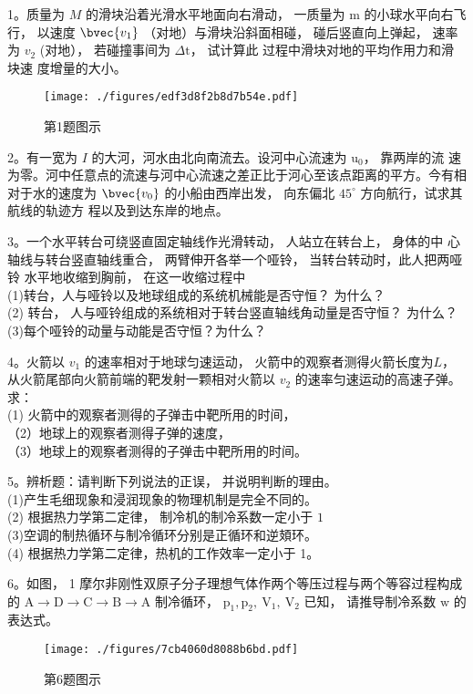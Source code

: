 
1。质量为 $M$ 的滑块沿着光滑水平地面向右滑动， 一质量为 $\mathrm{m}$ 的小球水平向右飞行， 以速度 $\bvec{v_1}$ （对地）与滑块沿斜面相碰， 碰后竖直向上弹起， 速率为
$v_2$ (对地）， 若碰撞事间为 $\Delta \mathrm{t}$， 试计算此 过程中滑块对地的平均作用力和滑块速
度增量的大小。
\begin{figure}[ht]
\centering
\texttt{[image: ./figures/edf3d8f2b8d7b54e.pdf]}
\caption{第1题图示} \label{fig_BNU12_1}
\end{figure}

2。有一宽为 $I$ 的大河，河水由北向南流去。设河中心流速为 $\mathrm{u}_{0}$， 靠两岸的流 速为零。河中任意点的流速与河中心流速之差正比于河心至该点距离的平方。今有相 对于水的速度为 $\bvec{v_0}$ 的小船由西岸出发， 向东偏北 $45^{\circ}$ 方向航行，试求其航线的轨迹方 程以及到达东岸的地点。

3。一个水平转台可绕竖直固定轴线作光滑转动， 人站立在转台上， 身体的中 心轴线与转台竖直轴线重合， 两臂伸开各举一个哑铃， 当转台转动时，此人把两哑铃 水平地收缩到胸前， 在这一收缩过程中\\
(1)转台，人与哑铃以及地球组成的系统机械能是否守恒？ 为什么？\\
(2) 转台， 人与哑铃组成的系统相对于转台竖直轴线角动量是否守恒？ 为什么？
(3)每个哑铃的动量与动能是否守恒？为什么？

4。火箭以 $v_1$ 的速率相对于地球匀速运动， 火箭中的观察者测得火箭长度为$L$，从火箭尾部向火箭前端的靶发射一颗相对火箭以 $v_{2}$ 的速率匀速运动的高速子弹。 求： \\(1) 火箭中的观察者测得的子弹击中靶所用的时间， \\（2）地球上的观察者测得子弹的速度， \\（3）地球上的观察者测得的子弹击中靶所用的时间。

5。辨析题：请判断下列说法的正误， 并说明判断的理由。\\
(1)产生毛细现象和浸润现象的物理机制是完全不同的。\\
(2) 根据热力学第二定律， 制冷机的制冷系数一定小于 $1$\\
(3)空调的制热循环与制冷循环分别是正循环和逆頍环。\\
(4) 根据热力学第二定律，热机的工作效率一定小于 1。

6。如图， 1 摩尔非刚性双原子分子理想气体作两个等压过程与两个等容过程构成的 $\mathrm{A} \rightarrow \mathrm{D} \rightarrow \mathrm{C} \rightarrow \mathrm{B} \rightarrow \mathrm{A}$
制冷循环， $\mathrm{p}_{1}, \mathrm{p}_{2}, \mathrm{~V}_{1}, \mathrm{~V}_{2}$ 已知， 请推导制冷系数 $\mathrm{w}$ 的表达式。
\begin{figure}[ht]
\centering
\texttt{[image: ./figures/7cb4060d8088b6bd.pdf]}
\caption{第6题图示} \label{fig_BNU12_2}
\end{figure}

